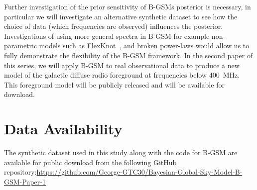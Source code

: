 \documentclass[fleqn,usenatbib]{mnras}
\begin{document}
Further investigation of the prior sensitivity of B-GSMs posterior is necessary, in particular we will investigate an alternative synthetic dataset to see how the choice of data (which frequencies are observed) influences the posterior. Investigations of using more general spectra in B-GSM for example non-parametric models such as FlexKnot~\citep{Shen2024}, and broken power-laws would allow us to fully demonstrate the flexibility of the B-GSM framework. In the second paper of this series, we will apply B-GSM to real observational data to produce a new model of the galactic diffuse radio foreground at frequencies below 400~MHz. This foreground model will be publicly released and will be available for download.







\section*{Data Availability}
The synthetic dataset used in this study along with the code for B-GSM are available for public download from the following GitHub repository:\newline \url{https://github.com/George-GTC30/Bayesian-Global-Sky-Model-B-GSM-Paper-1}




\newpage



\end{document}
